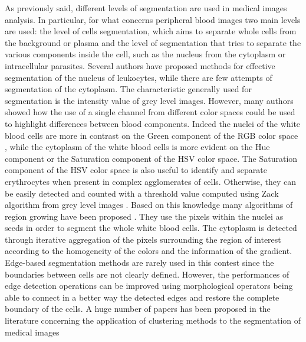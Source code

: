 As previously said, different levels of segmentation are used in medical images analysis. In particular, for what concerns peripheral blood images two main levels are used: the level of cells segmentation, which aims to separate whole cells from the background or plasma and the level of segmentation that tries to separate the various components inside the cell, such as the nucleus from the cytoplasm or intracellular parasites. Several authors have proposed methods for effective segmentation of the nucleus of leukocytes, while there are few attempts of segmentation of the cytoplasm. The characteristic generally used for segmentation is the intensity value of grey level images. However, many authors showed how the use of a single channel from different color spaces could be used to highlight differences between blood components. Indeed the nuclei of the white blood cells are more in contrast on the Green component of the RGB color space \cite{Cseke}, while the cytoplasm of the white blood cells is more evident on the Hue component \cite{Wu} or the Saturation component \cite{Halim} of the HSV color space. The Saturation component of the HSV color space is also useful to identify and separate erythrocytes \cite{DiR} when present in complex agglomerates of cells. Otherwise, they can be easily detected and counted with a threshold value computed using Zack algorithm from grey level images \cite{Berge}. Based on this knowledge many algorithms of region growing have been proposed \cite{Kovalev, Lez98, Lez02}. They use the pixels within the nuclei as seeds in order to segment the whole white blood cells. The cytoplasm is detected through iterative aggregation of the pixels surrounding the region of interest according to the homogeneity of the colors and the information of the gradient. Edge-based segmentation methods are rarely used in this contest since the boundaries between cells are not clearly defined. However, the performances of edge detection operations can be improved using morphological operators \cite{Piuri, Sco05} being able to connect in a better way the detected edges and restore the complete boundary of the cells. 
A huge number of papers has been proposed in the literature concerning the application
of clustering methods to the segmentation of medical images \cite{Karthikeyan2017}

